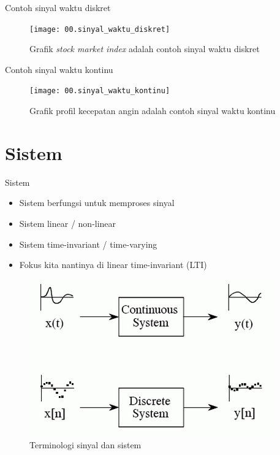 \documentclass[aspectratio=169]{beamer}
\begin{document}
\begin{frame}{Contoh sinyal waktu diskret}
	\begin{figure}
		\texttt{[image: 00.sinyal\_waktu\_diskret]}
		\caption{Grafik \textit{stock market index} adalah contoh sinyal waktu diskret}
	\end{figure}
\end{frame}

\begin{frame}{Contoh sinyal waktu kontinu}

	\begin{figure}
		\texttt{[image: 00.sinyal\_waktu\_kontinu]}
		\caption{Grafik profil kecepatan angin adalah contoh sinyal waktu kontinu}
	\end{figure}
\end{frame}


\section{Sistem}

\begin{frame}{Sistem}
	\begin{multicols}{2}
		\begin{itemize}
			\item Sistem berfungsi untuk memproses sinyal
			\item Sistem linear / non-linear
			\item Sistem time-invariant / time-varying
			\item Fokus kita nantinya di linear time-invariant (LTI)
		\end{itemize}
		\vfill\null
		\columnbreak
		\begin{figure}
			\centering
			\includegraphics[height=0.5 \textheight]{gambar/00.sistem}
			\caption{Terminologi sinyal dan sistem}
		\end{figure}
	\end{multicols}
\end{frame}
\end{document}
